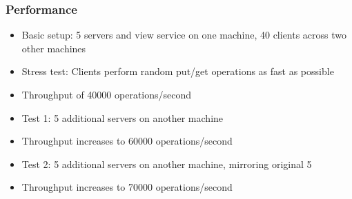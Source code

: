 \documentclass{beamer}
\begin{document}
    \begin{frame}
      \frametitle{Performance}
      \begin{itemize}
        \item Basic setup: 5 servers and view service on one machine, 40 clients across two other machines
        \item Stress test: Clients perform random put/get operations as fast as possible
        \item Throughput of 40000 operations/second
        \item Test 1: 5 additional servers on another machine
        \item Throughput increases to 60000 operations/second
        \item Test 2: 5 additional servers on another machine, mirroring original 5
        \item Throughput increases to 70000 operations/second
      \end{itemize}
    \end{frame}
\end{document}
